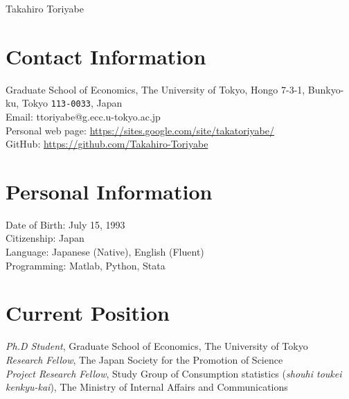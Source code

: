 \documentclass[11pt, a4paper]{article} %
\begin{document}

{\LARGE Takahiro Toriyabe}\\[1cm] %

\section*{Contact Information}
Graduate School of Economics, The University of Tokyo, Hongo 7-3-1, Bunkyo-ku, Tokyo \texttt{113-0033}, Japan\\
Email: ttoriyabe@g.ecc.u-tokyo.ac.jp\\ %
Personal web page: \url{https://sites.google.com/site/takatoriyabe/} \\ %
GitHub: \url{https://github.com/Takahiro-Toriyabe}



\section*{Personal Information}

Date of Birth: July 15, 1993\\ %
Citizenship: Japan\\ %
Language: Japanese (Native), English (Fluent) \\
Programming: Matlab, Python, Stata


\section*{Current Position}

\emph{Ph.D Student}, Graduate School of Economics, The University of Tokyo\\
\emph{Research Fellow}, The Japan Society for the Promotion of Science \\
\emph{Project Research Fellow}, Study Group of Consumption statistics (\textit{shouhi toukei kenkyu-kai}), The Ministry of Internal Affairs and Communications
\end{document}
